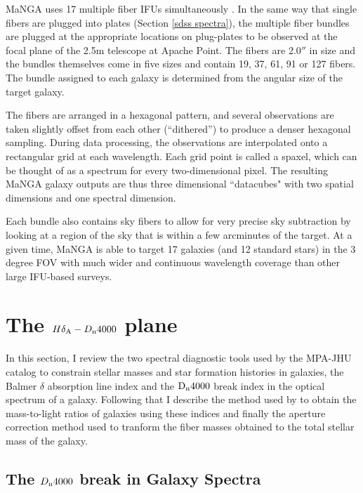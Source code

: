 MaNGA uses 17 multiple fiber IFUs simultaneously
\citep{drory_manga_2015}.
In the same way that single fibers are plugged into 
plates (Section \ref{sdss spectra}), the multiple 
fiber bundles are plugged at the appropriate 
locations on plug-plates to be observed at the 
focal plane of the 2.5m telescope at Apache Point. 
The fibers are 2.0$''$ in size and the bundles 
themselves come in five sizes and contain 19, 
37, 61, 91 or 127 fibers. The bundle assigned to 
each galaxy is determined from the 
angular size of the target galaxy. 

The fibers are arranged in a hexagonal pattern, 
and several observations are taken slightly offset 
from each other (``dithered'') to produce a denser 
hexagonal sampling. During data processing, the 
observations are interpolated onto a rectangular 
grid at each wavelength. 
Each grid point is called a spaxel, which can be 
thought of as a spectrum for every two-dimensional 
pixel. The resulting MaNGA galaxy outputs are 
thus three dimensional ``datacubes" with two 
spatial dimensions and one spectral dimension. 

Each bundle also contains sky fibers to allow for 
very precise sky subtraction by looking at a region of 
the sky that is within a few arcminutes of the target. 
At a given time, MaNGA is able to target 17 galaxies 
(and 12 standard stars) in the 3 degree FOV with much 
wider and continuous wavelength coverage than other
large IFU-based surveys.\\

\section{The $H\delta_{\rm A}-D_{\rm n}4000$ plane}
\label{indices}

In this section, I review the two spectral diagnostic tools used by the MPA-JHU catalog to constrain stellar masses and star formation histories in galaxies, the Balmer $\delta$ absorption line index and the ${\rm D}_{\rm n}4000$ break index in the optical spectrum of a galaxy. Following that I describe the method used by \citet{kauffmann_stellar_2003} to obtain the mass-to-light ratios of galaxies using these indices and finally the aperture correction method used to tranform the fiber masses obtained to the total stellar mass of the galaxy.\\

\subsection{The $D_{\rm n}4000$ break in Galaxy Spectra}
\label{d4000}

